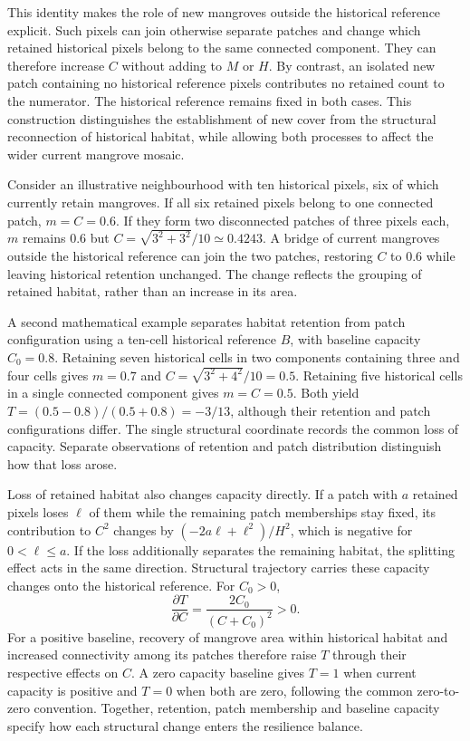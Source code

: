 This identity makes the role of new mangroves outside the historical reference explicit. Such pixels can join otherwise separate patches and change which retained historical pixels belong to the same connected component. They can therefore increase $C$ without adding to $M$ or $H$. By contrast, an isolated new patch containing no historical reference pixels contributes no retained count to the numerator. The historical reference remains fixed in both cases. This construction distinguishes the establishment of new cover from the structural reconnection of historical habitat, while allowing both processes to affect the wider current mangrove mosaic.

Consider an illustrative neighbourhood with ten historical pixels, six of which currently retain mangroves. If all six retained pixels belong to one connected patch, $m=C=0.6$. If they form two disconnected patches of three pixels each, $m$ remains 0.6 but $C=\sqrt{3^2+3^2}/10\simeq0.4243$. A bridge of current mangroves outside the historical reference can join the two patches, restoring $C$ to 0.6 while leaving historical retention unchanged. The change reflects the grouping of retained habitat, rather than an increase in its area.

A second mathematical example separates habitat retention from patch configuration using a ten-cell historical reference $B$, with baseline capacity $C_0=0.8$. Retaining seven historical cells in two components containing three and four cells gives $m=0.7$ and $C=\sqrt{3^2+4^2}/10=0.5$. Retaining five historical cells in a single connected component gives $m=C=0.5$. Both yield \mbox{$T=(0.5-0.8)/(0.5+0.8)=-3/13$}, although their retention and patch configurations differ. The single structural coordinate records the common loss of capacity. Separate observations of retention and patch distribution distinguish how that loss arose. 

Loss of retained habitat also changes capacity directly. If a patch with $a$ retained pixels loses $\ell$ of them while the remaining patch memberships stay fixed, its contribution to $C^2$ changes by $(-2a\ell+\ell^2)/H^2$, which is negative for $0<\ell\leq a$. If the loss additionally separates the remaining habitat, the splitting effect acts in the same direction. Structural trajectory carries these capacity changes onto the historical reference. For $C_0>0$,
\[
\frac{\partial T}{\partial C}=\frac{2C_0}{(C+C_0)^2}>0.
\]
For a positive baseline, recovery of mangrove area within historical habitat and increased connectivity among its patches therefore raise $T$ through their respective effects on $C$. A zero capacity baseline gives $T=1$ when current capacity is positive and $T=0$ when both are zero, following the common zero-to-zero convention. Together, retention, patch membership and baseline capacity specify how each structural change enters the resilience balance.

